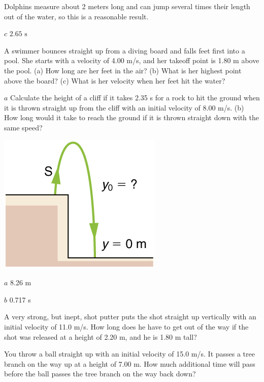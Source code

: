 \documentclass[
]{book}
\begin{document}
Dolphins measure about 2 meters long and can jump several times their
length out of the water, so this is a reasonable result.

\(c\) \({2\text{.}\text{65\ s}}{}\)

\hypertarget{fs-id1818111}{}
\leavevmode{}%
A swimmer bounces straight up from a diving board and falls feet first
into a pool. She starts with a velocity of 4.00 m/s, and her takeoff
point is 1.80 m above the pool. (a) How long are her feet in the air?
(b) What is her highest point above the board? (c) What is her velocity
when her feet hit the water?

\hypertarget{fs-id4035152}{}
\leavevmode{}%
\(a\) Calculate the height of a cliff if it takes 2.35 s for a rock to
hit the ground when it is thrown straight up from the cliff with an
initial velocity of 8.00 m/s. (b) How long would it take to reach the
ground if it is thrown straight down with the same speed?

\leavevmode{}%
\includegraphics{images/Figure_02_07_05.jpg}

\(a\) 8.26 m

\(b\) 0.717 s

\hypertarget{fs-id2576295}{}
\leavevmode{}%
A very strong, but inept, shot putter puts the shot straight up
vertically with an initial velocity of 11.0 m/s. How long does he have
to get out of the way if the shot was released at a height of 2.20 m,
and he is 1.80 m tall?

\hypertarget{fs-id3543404}{}
\leavevmode{}%
You throw a ball straight up with an initial velocity of 15.0 m/s. It
passes a tree branch on the way up at a height of 7.00 m. How much
additional time will pass before the ball passes the tree branch on the
way back down?
\end{document}
